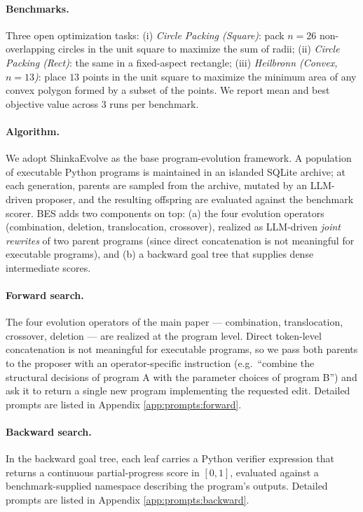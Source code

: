 \documentclass{llmxive}
\begin{document}
\paragraph{Benchmarks.}
Three open optimization tasks: (i) \emph{Circle Packing (Square)}:
pack $n=26$ non-overlapping circles in the unit square to maximize the
sum of radii; (ii) \emph{Circle Packing (Rect)}: the same in a
fixed-aspect rectangle; (iii) \emph{Heilbronn (Convex, $n=13$)}: place
$13$ points in the unit square to maximize the minimum area of any
convex polygon formed by a subset of the points. We report mean and
best objective value across $3$ runs per benchmark.

\paragraph{Algorithm.}
We adopt ShinkaEvolve as the base program-evolution framework. A
population of executable Python programs is maintained in an islanded
SQLite archive; at each generation, parents are sampled from the
archive, mutated by an LLM-driven proposer, and the resulting offspring
are evaluated against the benchmark scorer. BES adds two components on
top: (a) the four evolution operators (combination, deletion, translocation,
crossover), realized as LLM-driven \emph{joint rewrites} of two parent
programs (since direct concatenation is not meaningful for executable
programs), and (b) a backward goal tree that supplies dense
intermediate scores.


\paragraph{Forward search.}

The four evolution operators of the main paper --- combination,
translocation, crossover, deletion --- are realized at the
program level. Direct token-level concatenation is not
meaningful for executable programs, so we pass both parents to the proposer with an operator-specific instruction (e.g.\ ``combine the
structural decisions of program A with the parameter choices of
program B'') and ask it to return a single new program implementing the requested edit. Detailed prompts are listed in Appendix \ref{app:prompts:forward}.

\paragraph{Backward search.}
In the backward goal tree, each leaf carries a Python verifier
expression that returns a continuous partial-progress score in
$[0,1]$, evaluated against a benchmark-supplied namespace describing the program's outputs. Detailed prompts are listed in Appendix \ref{app:prompts:backward}.
\end{document}
